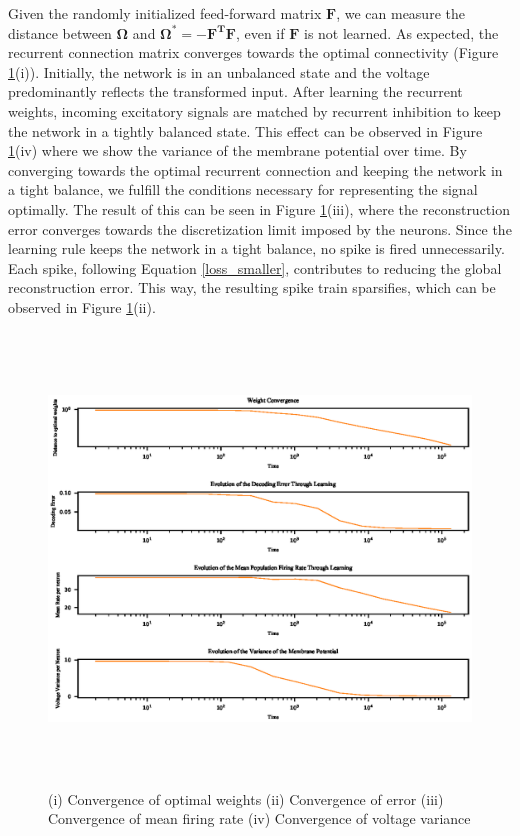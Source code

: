 \documentclass[twoside,11pt]{article}
\begin{document}
Given the randomly initialized feed-forward matrix $\mathbf{F}$, we can measure the distance
between $\mathbf{\Omega}$ and $\mathbf{\Omega}^* = \mathbf{-F^TF}$, even if $\mathbf{F}$ is not learned.
As expected, the recurrent connection matrix converges towards the
optimal connectivity (Figure \ref{fig:convergence}(i)).
Initially, the network is in an unbalanced state and the
voltage predominantly reflects the transformed input.
After learning the recurrent weights, incoming excitatory signals are matched by
recurrent inhibition to keep the network in a tightly balanced state. This effect can be
observed in Figure \ref{fig:convergence}(iv) where we show the variance of the
membrane potential over time. By converging towards the optimal recurrent connection
and keeping the network in a tight balance, we fulfill the conditions necessary
for representing the signal optimally. The result of this can be seen
in Figure \ref{fig:convergence}(iii), where
the reconstruction error converges towards the discretization limit imposed by the
neurons. Since the learning rule keeps the network in a tight balance, no spike is fired
unnecessarily. Each spike, following Equation \ref{loss_smaller}, contributes
to reducing the global reconstruction error. This way, the resulting spike train sparsifies,
which can be observed in Figure \ref{fig:convergence}(ii). \\

\begin{figure}[!htb]
  \includegraphics[width = \columnwidth, height=12cm]{figures/convergence.eps}
  \caption{(i) Convergence of optimal weights
  (ii) Convergence of error (iii) Convergence of mean firing rate (iv) Convergence
  of voltage variance}
  \label{fig:convergence}
\end{figure}
\newpage
\end{document}
